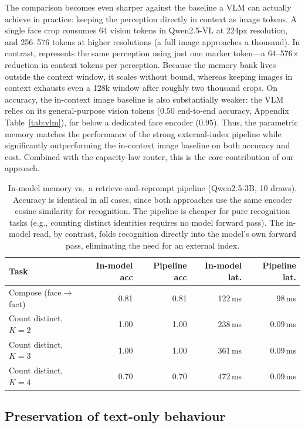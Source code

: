 The comparison becomes even sharper against the baseline a VLM can actually achieve in practice: keeping the perception directly in context as image tokens. A single face crop consumes 64 vision tokens in Qwen2.5-VL at 224px resolution, and 256--576 tokens at higher resolutions (a full image approaches a thousand). In contrast, \attmem{} represents the same perception using just one marker token---a 64--576$\times$ reduction in context tokens per perception. Because the memory bank lives outside the context window, it scales without bound, whereas keeping images in context exhausts even a 128k window after roughly two thousand crops. On accuracy, the in-context image baseline is also substantially weaker: the VLM relies on its general-purpose vision tokens ($0.50$ end-to-end accuracy, Appendix Table~\ref{tab:vlm}), far below a dedicated face encoder ($0.95$). Thus, the parametric memory matches the performance of the strong external-index pipeline while significantly outperforming the in-context image baseline on both accuracy and cost. Combined with the capacity-law router, this is the core contribution of our approach.

\begin{table}[h]
\small\centering
\caption{In-model memory vs.\ a retrieve-and-reprompt pipeline (Qwen2.5-3B, 10 draws). Accuracy is identical in all cases, since both approaches use the same encoder cosine similarity for recognition. The pipeline is cheaper for pure recognition tasks (e.g., counting distinct identities requires no model forward pass). The in-model read, by contrast, folds recognition directly into the model's own forward pass, eliminating the need for an external index.}
\label{tab:pipeline}
\begin{tabular}{@{}lrrrr@{}}
\toprule
\textbf{Task} & \textbf{In-model acc} & \textbf{Pipeline acc} & \textbf{In-model lat.} & \textbf{Pipeline lat.} \\
\midrule
Compose (face$\to$fact)      & 0.81 & 0.81 & 122\,ms & 98\,ms \\
Count distinct, $K{=}2$      & 1.00 & 1.00 & 238\,ms & 0.09\,ms \\
Count distinct, $K{=}3$      & 1.00 & 1.00 & 361\,ms & 0.09\,ms \\
Count distinct, $K{=}4$      & 0.70 & 0.70 & 472\,ms & 0.09\,ms \\
\bottomrule
\end{tabular}
\end{table}

\subsection{Preservation of text-only behaviour}
\label{sub:nonreg}

